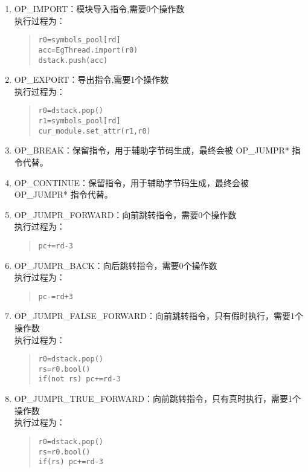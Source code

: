 \begin{enumerate}
\item OP\_IMPORT：模块导入指令,需要0个操作数 \\
执行过程为：
\begin{quote}
\begin{verbatim}
r0=symbols_pool[rd]
acc=EgThread.import(r0)
dstack.push(acc)
\end{verbatim}
\end{quote}

\item OP\_EXPORT：导出指令,需要1个操作数 \\
执行过程为：
\begin{quote}
\begin{verbatim}
r0=dstack.pop()
r1=symbols_pool[rd]
cur_module.set_attr(r1,r0)
\end{verbatim}
\end{quote}

\item OP\_BREAK：保留指令，用于辅助字节码生成，最终会被 OP\_JUMPR* 指令代替。
\item OP\_CONTINUE：保留指令，用于辅助字节码生成，最终会被 OP\_JUMPR* 指令代替。

\item OP\_JUMPR\_FORWARD：向前跳转指令，需要0个操作数 \\
执行过程为：
\begin{quote}
\begin{verbatim}
pc+=rd-3
\end{verbatim}
\end{quote}

\item OP\_JUMPR\_BACK：向后跳转指令，需要0个操作数 \\
执行过程为：
\begin{quote}
\begin{verbatim}
pc-=rd+3
\end{verbatim}
\end{quote}

\item OP\_JUMPR\_FALSE\_FORWARD：向前跳转指令，只有假时执行，需要1个操作数 \\
执行过程为：
\begin{quote}
\begin{verbatim}
r0=dstack.pop()
rs=r0.bool()
if(not rs) pc+=rd-3
\end{verbatim}
\end{quote}

\item OP\_JUMPR\_TRUE\_FORWARD：向前跳转指令，只有真时执行，需要1个操作数 \\
执行过程为：
\begin{quote}
\begin{verbatim}
r0=dstack.pop()
rs=r0.bool()
if(rs) pc+=rd-3
\end{verbatim}
\end{quote}


\end{enumerate}
